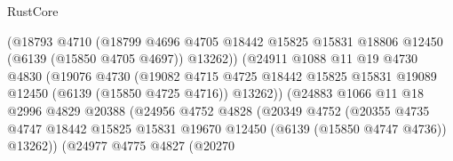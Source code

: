 \begin{lexlean}{RustCore}
\begin{coremodule}
                                  (@18793
                                    @4710
                                    (@18799
                                      @4696
                                      @4705
                                      @18442
                                      @15825
                                      @15831
                                      @18806
                                      @12450
                                      (@6139 (@15850 @4705 @4697))
                                      @13262))
                                  (@24911
                                    @1088
                                    @11
                                    @19
                                    @4730
                                    @4830
                                    (@19076
                                      @4730
                                      (@19082
                                        @4715
                                        @4725
                                        @18442
                                        @15825
                                        @15831
                                        @19089
                                        @12450
                                        (@6139 (@15850 @4725 @4716))
                                        @13262))
                                    (@24883
                                      @1066
                                      @11
                                      @18
                                      @2996
                                      @4829
                                      @20388
                                      (@24956
                                        @4752
                                        @4828
                                        (@20349
                                          @4752
                                          (@20355
                                            @4735
                                            @4747
                                            @18442
                                            @15825
                                            @15831
                                            @19670
                                            @12450
                                            (@6139 (@15850 @4747 @4736))
                                            @13262))
                                        (@24977
                                          @4775
                                          @4827
                                          (@20270

\end{coremodule}
\end{lexlean}
